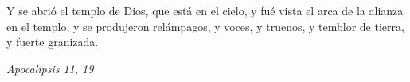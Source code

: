 \documentclass[../../devocionario.tex]{subfiles}
\begin{document}
    Y se abrió el templo de Dios, que está en el cielo, y fué vista el arca de la alianza en el templo, 
    y se produjeron relámpagos, y voces, y truenos, y temblor de tierra, y fuerte granizada. 

    \begin{flushright}
        \textit{Apocalipsis 11, 19}
    \end{flushright}
\end{document}
